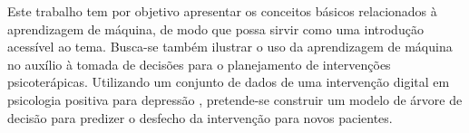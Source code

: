 Este trabalho tem por objetivo apresentar os conceitos básicos relacionados à aprendizagem de máquina, de modo que possa sirvir como uma introdução acessível
ao tema. Busca-se também ilustrar o uso da aprendizagem de máquina no auxílio à tomada de decisões para o planejamento de intervenções psicoterápicas. Utilizando
um conjunto de dados de uma intervenção digital em psicologia positiva para depressão \cite{Collins2023}, pretende-se construir um modelo de árvore de decisão
para predizer o desfecho da intervenção para novos pacientes.